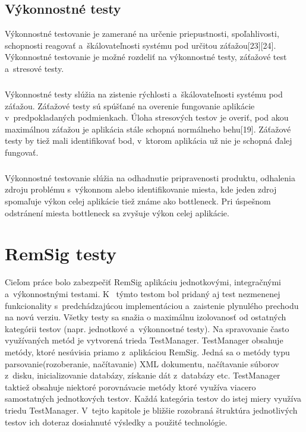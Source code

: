 \documentclass[
  digital, %
  table,   %
oneside,
  nolof,     %
  nolot,     %
]{fithesis3}
\begin{document}
\section{Výkonnostné testy}
Výkonnostné testovanie je zamerané na určenie priepustnosti, spoľahlivosti, schopnosti reagovať a~škálovateľnosti systému pod určitou záťažou[23][24]. Výkonnostné testovanie je možné rozdeliť na výkonnostné testy, záťažové test a~stresové testy.\paragraph{}
Výkonnostné testy slúžia na zistenie rýchlosti a~škálovateľnosti systému pod záťažou. Záťažové testy sú spúšťané na overenie fungovanie aplikácie v~predpokladaných podmienkach. Úloha stresových  testov je overiť, pod akou maximálnou záťažou je aplikácia stále schopná normálneho behu[19]. Záťažové testy by tiež mali identifikovať bod, v~ktorom aplikácia už nie je schopná ďalej fungovať.\paragraph{}
Výkonnostné testovanie slúžia na odhadnutie pripravenosti produktu, odhalenia zdroju problému s~výkonnom alebo  identifikovanie miesta, kde jeden zdroj spomaľuje výkon celej aplikácie tiež známe ako bottleneck. Pri úspešnom odstránení miesta bottleneck sa zvyšuje výkon celej aplikácie.
\chapter{RemSig testy}
Cieľom práce bolo zabezpečiť  RemSig aplikáciu jednotkovými, integračnými a~výkonnostnými testami. K~ týmto testom bol pridaný aj test nezmenenej funkcionality s~predchádzajúcou implementáciou a~zaistenie plynulého prechodu na novú verziu. Všetky  testy sa snažia o maximálnu izolovanosť od ostatných kategórii  testov (napr. jednotkové a~výkonnostné testy). Na spravovanie často využívaných metód je vytvorená trieda TestManager. TestManager obsahuje metódy, ktoré nesúvisia priamo z~aplikáciou RemSig. Jedná sa o metódy typu parsovanie(rozoberanie, načítavanie) XML dokumentu, načítavanie súborov z~disku, inicializovanie databázy, získanie dát z~databázy etc. TestManager taktiež obsahuje niektoré porovnávacie metódy ktoré využíva viacero samostatných jednotkových testov. Každá kategória testov do istej miery využíva triedu TestManager. V~tejto kapitole je bližšie rozobraná štruktúra jednotlivých testov ich doteraz dosiahnuté výsledky a použité technológie.
\end{document}
